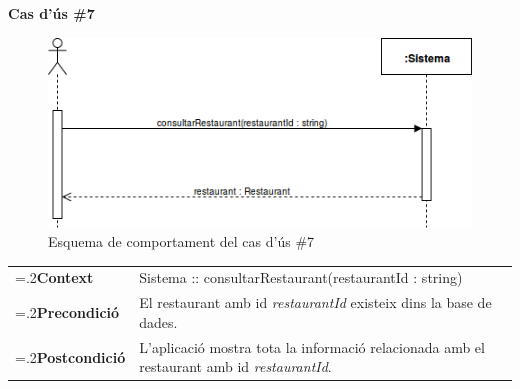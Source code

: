 \clearpage
\noindent\textbf{\large Cas d'ús \#7}\\
\begin{figure}[H]
\centering
\includegraphics[scale=0.6]{Figures/casdus_07.png}
\caption{Esquema de comportament del cas d'ús \#7}
\end{figure}
\begin{table}[h]
\noindent
\begin{tabularx}{\linewidth}{
>{\hsize=.2\hsize}X%
>{\hsize=0.8\hsize}X%
}
\textbf{Context} 		& Sistema :: consultarRestaurant(restaurantId : string) \\
\textbf{Precondició} 	& El restaurant amb id \textit{restaurantId} existeix dins la base de dades. \\
\textbf{Postcondició}	& L'aplicació mostra tota la informació relacionada amb el restaurant amb id \textit{restaurantId}. \\
\end{tabularx}
\label{}
\end{table}

